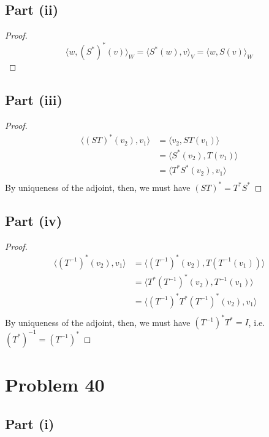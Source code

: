 \documentclass{article}
\begin{document}
\subsection*{Part (ii)}
\begin{proof}
$$\langle w, (S^{*})^{*}(v) \rangle_W = \langle S^{*}(w), v \rangle_V = \langle w, S(v) \rangle_W$$
\end{proof}

\subsection*{Part (iii)}

\begin{proof}
\begin{align*}
\langle (ST)^{*}(v_2), v_1 \rangle &= \langle v_2, ST(v_1) \rangle \\
&= \langle S^{*}(v_2), T(v_1) \rangle \\
&= \langle T^{*}S^{*}(v_2), v_1 \rangle \\
\end{align*}
By uniqueness of the adjoint, then, we must have $(ST)^{*} = T^{*}S^{*}$
\end{proof}

\subsection*{Part (iv)}

\begin{proof}
\begin{align*}
\langle (T^{-1})^{*}(v_2), v_1 \rangle &= \langle (T^{-1})^{*}(v_2), T(T^{-1}(v_1)) \rangle \\
&= \langle T^{*}(T^{-1})^{*}(v_2), T^{-1}(v_1) \rangle \\
&= \langle (T^{-1})^{*}T^{*}(T^{-1})^{*}(v_2), v_1 \rangle \\
\end{align*}
By uniqueness of the adjoint, then, we must have $(T^{-1})^{*}T^{*} = I$, i.e. $(T^{*})^{-1} = (T^{-1})^{*}$
\end{proof}


\section*{Problem 40}

\subsection*{Part (i)}
\end{document}
